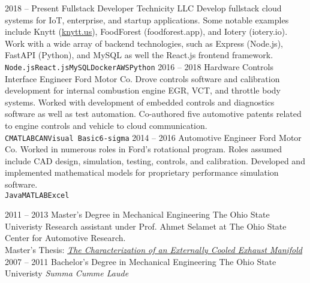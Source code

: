 \documentclass[9pt]{developercv} %
\begin{document}
\begin{entrylist}
	\entry
		{2018 -- Present}
		{Fullstack Developer}
		{Technicity LLC}
		{Develop fullstack cloud systems for IoT, enterprise,
		and startup applications. 
		Some notable examples include Knytt (\href{https://knytt.us}{knytt.us}),
		FoodForest (foodforest.app), and Iotery (iotery.io). 
		Work with a wide array of backend technologies, such as Express (Node.js),
		FastAPI (Python), and MySQL as well the React.js frontend framework.
		\\
		\texttt{Node.js}\slashsep\texttt{React.js}\slashsep\texttt{MySQL}\slashsep\texttt{Docker}\slashsep\texttt{AWS}\slashsep\texttt{Python}}
	\entry
		{2016 -- 2018}
		{Hardware Controls Interface Engineer}
		{Ford Motor Co.}
		{Drove controls software and calibration development for internal
		combustion engine EGR, VCT, and throttle body systems.
		Worked with development of embedded controls and diagnostics
		software as well as test automation. Co-authored five 
		automotive patents related to engine controls and vehicle to
		cloud communication. \\
		\texttt{C}\slashsep\texttt{MATLAB}\slashsep\texttt{CAN}\slashsep\texttt{Visual Basic}\slashsep\texttt{6-sigma}}
	\entry
		{2014 -- 2016}
		{Automotive Engineer}
		{Ford Motor Co.}
		{Worked in numerous roles in Ford's rotational program. Roles assumed include CAD design,
		simulation, testing, controls, and calibration. Developed and implemented mathematical models
		for proprietary performance simulation software.\\ 
		\texttt{Java}\slashsep\texttt{MATLAB}\slashsep\texttt{Excel}}
\end{entrylist}



\begin{entrylist}
	\entry
		{2011 -- 2013}
		{Master's Degree in Mechanical Engineering}
		{The Ohio State Univeristy}
		{Research assistant under Prof. Ahmet Selamet at The Ohio State Center for Automotive Research. \\ 
		Master's Thesis: 
		\it{\href{https://etd.ohiolink.edu/!etd.send_file?accession=osu1385982535&disposition=inline}{The Characterization of an Externally Cooled Exhaust Manifold}}}
	\entry
		{2007 -- 2011}
		{Bachelor's Degree in Mechanical Engineering}
		{The Ohio State Univeristy}
		{\it{Summa Cumme Laude}}
\end{entrylist}
\end{document}
